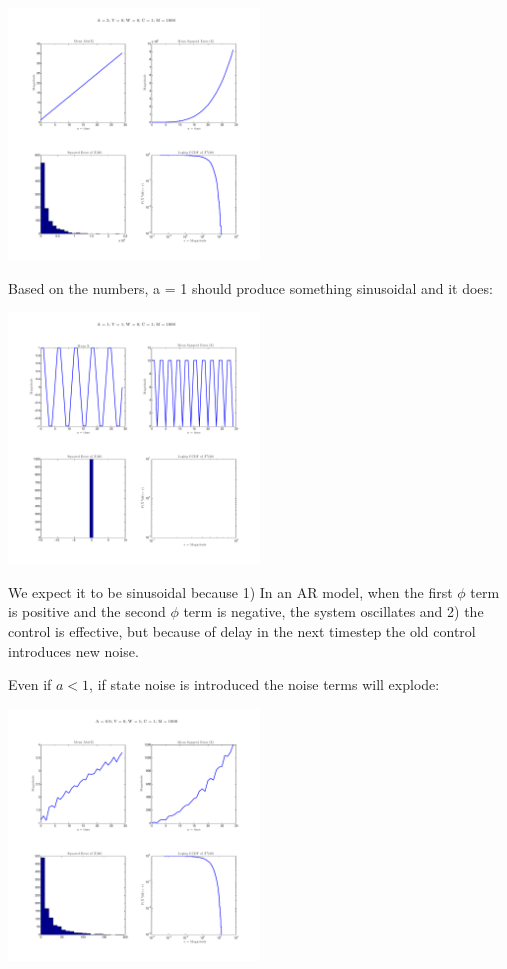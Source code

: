 \documentclass[leqno,twocolumn]{article}
\begin{document}
{\begin{center}\includegraphics[width=0.5\textwidth]{udelay_3}\end{center}

Based on the numbers, a = 1 should produce something sinusoidal and it does:
\begin{center}\includegraphics[width=0.5\textwidth]{udelay_6}\end{center}
We expect it to be sinusoidal because 1) In an AR model, when the first $\phi$ term is positive and the second $\phi$ term is negative, the system oscillates and 2) the control is effective, but because of delay in the next timestep the old control introduces new noise.

Even if $a < 1$, if state noise is introduced the noise terms will explode:
\begin{center}
\includegraphics[width=0.5\textwidth]{udelay_4}
\end{center}

}
\end{document}
